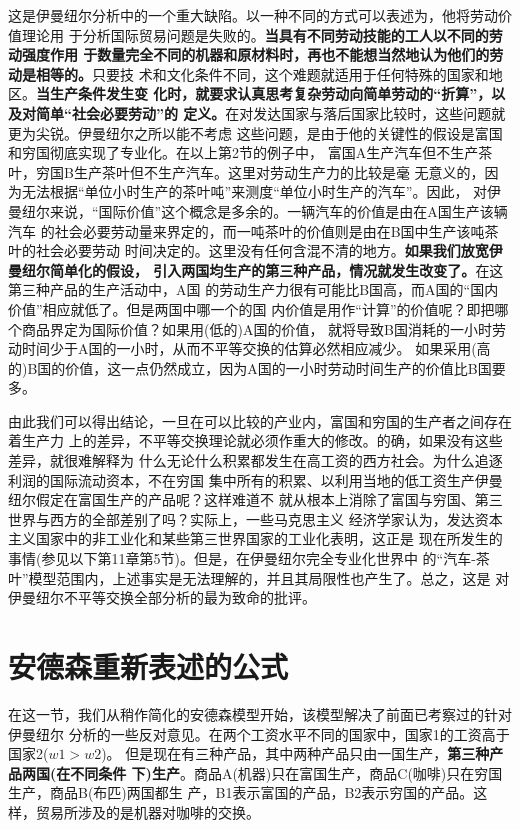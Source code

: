 这是伊曼纽尔分析中的一个重大缺陷。以一种不同的方式可以表述为，他将劳动价值理论用
于分析国际贸易问题是失败的。\textbf{当具有不同劳动技能的工人以不同的劳动强度作用
  于数量完全不同的机器和原材料时，再也不能想当然地认为他们的劳动是相等的。}只要技
术和文化条件不同，这个难题就适用于任何特殊的国家和地区。\textbf{当生产条件发生变
  化时，就要求认真思考复杂劳动向简单劳动的“折算”，以及对简单“社会必要劳动”的
  定义。}在对发达国家与落后国家比较时，这些问题就更为尖锐。伊曼纽尔之所以能不考虑
这些问题，是由于他的关键性的假设是富国和穷国彻底实现了专业化。在以上第2节的例子中，
富国A生产汽车但不生产茶叶，穷国B生产茶叶但不生产汽车。这里对劳动生产力的比较是毫
无意义的，因为无法根据“单位小时生产的茶叶吨”来测度“单位小时生产的汽车”。因此，
对伊曼纽尔来说，“国际价值”这个概念是多余的。一辆汽车的价值是由在A国生产该辆汽车
的社会必要劳动量来界定的，而一吨茶叶的价值则是由在B国中生产该吨茶叶的社会必要劳动
时间决定的。这里没有任何含混不清的地方。\textbf{如果我们放宽伊曼纽尔简单化的假设，
  引入两国均生产的第三种产品，情况就发生改变了。}在这第三种产品的生产活动中，A国
的劳动生产力很有可能比B国高，而A国的“国内价值”相应就低了。但是两国中哪一个的国
内价值是用作“计算”的价值呢？即把哪个商品界定为国际价值？如果用(低的)A国的价值，
就将导致B国消耗的一小时劳动时间少于A国的一小时，从而不平等交换的估算必然相应减少。
如果采用(高的)B国的价值，这一点仍然成立，因为A国的一小时劳动时间生产的价值比B国要
多。

由此我们可以得出结论，一旦在可以比较的产业内，富国和穷国的生产者之间存在着生产力
上的差异，不平等交换理论就必须作重大的修改。的确，如果没有这些差异，就很难解释为
什么无论什么积累都发生在高工资的西方社会。为什么追逐利润的国际流动资本，不在穷国
集中所有的积累、以利用当地的低工资生产伊曼纽尔假定在富国生产的产品呢？这样难道不
就从根本上消除了富国与穷国、第三世界与西方的全部差别了吗？实际上，一些马克思主义
经济学家认为，发达资本主义国家中的非工业化和某些第三世界国家的工业化表明，这正是
现在所发生的事情(参见以下第11章第5节)。但是，在伊曼纽尔完全专业化世界中
的“汽车-茶叶”模型范围内，上述事实是无法理解的，并且其局限性也产生了。总之，这是
对伊曼纽尔不平等交换全部分析的最为致命的批评。

\section{安德森重新表述的公式}

在这一节，我们从稍作简化的安德森模型开始，该模型解决了前面已考察过的针对伊曼纽尔
分析的一些反对意见。在两个工资水平不同的国家中，国家1的工资高于国家2($w1 > w2$)。
但是现在有三种产品，其中两种产品只由一国生产，\textbf{第三种产品两国(在不同条件
  下)生产}。商品A(机器)只在富国生产，商品C(咖啡)只在穷国生产，商品B(布匹)两国都生
产，B1表示富国的产品，B2表示穷国的产品。这样，贸易所涉及的是机器对咖啡的交换。


